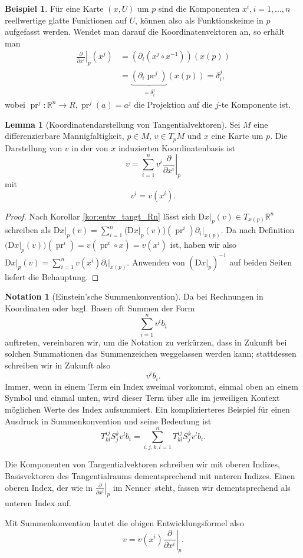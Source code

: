 \documentclass[a4paper]{scrreprt}
\numberwithin{equation}{chapter}
\newcommand{\DD}{\mathrm{D}}
\DeclareMathOperator{\pr}{pr}
\newcommand{\R}{\mathbb{R}}
\theoremstyle{definition}
\newtheorem{lemma}[defn]{Lemma}
\newtheorem{bsp}[defn]{Beispiel}
\newtheorem{nota}[defn]{Notation}
\begin{document}
\begin{bsp}
	Für eine Karte $(x,U)$ um $p$ sind die Komponenten $x^i, i = 1,\dots, n$ reellwertige glatte Funktionen auf $U$, können also als Funktionskeime in $p$ aufgefasst werden. Wendet man darauf die Koordinatenvektoren an, so erhält man
	\begin{align*}
		\left.\frac{\partial}{\partial x^i}\right|_p (x^j) &= \left(\partial_i \left(x^j\circ x^{-1}\right)\right) (x(p))\\
		&= \underbrace{\left(\partial_i \pr^j\right)}_{= \delta^j_i} (x(p)) = \delta^j_i,
	\end{align*}
	wobei $\pr^j\colon \mathbb R^n \to R, \pr^j(a) = a^j$ die Projektion auf die $j$-te Komponente ist.
\end{bsp}

\begin{lemma}[Koordinatendarstellung von Tangentialvektoren]
	Sei $M$ eine differenzierbare Mannigfaltigkeit, $p \in M$, $v \in T_pM$ und $x$ eine Karte um $p$. Die Darstellung von $v$ in der von $x$ induzierten Koordinatenbasis ist
	\[v = \sum_{i=1}^n v^i \left.\frac{\partial}{\partial x^i}\right|_p\]
	mit
	\[v^i = v(x^i).\]

	\begin{proof}
		Nach Korollar \ref{kor:entw_tangt_Rn} lässt sich $\left.\DD x\right|_p(v) \in T_{x(p)}\R^n$ schreiben als $\left.\DD x\right|_p(v) = \sum_{i=1}^n \Big(\DD x\big|_p(v)\Big) (\pr^i) \left.\partial_i\right|_{x(p)}$. Da nach Definition $\Big(\DD x\big|_p(v)\Big) (\pr^i) = v(\pr^i \circ x) = v(x^i)$ ist, haben wir also $\left.\DD x\right|_p(v) = \sum_{i=1}^n v(x^i) \left.\partial_i\right|_{x(p)}$.
		Anwenden von $\left(\left.\DD x\right|_p\right)^{-1}$ auf beiden Seiten liefert die Behauptung.
	\end{proof}
\end{lemma}

\begin{nota}[Einstein'sche Summenkonvention]
	Da bei Rechnungen in Koordinaten oder bzgl. Basen oft Summen der Form
	\[\sum_{i=1}^n v^i b_i\]
	auftreten, vereinbaren wir, um die Notation zu verkürzen, dass in Zukunft bei solchen Summationen das Summenzeichen weggelassen werden kann; stattdessen schreiben wir in Zukunft also
	\[v^i b_i.\]
	Immer, wenn in einem Term ein Index zweimal vorkommt, einmal oben an einem Symbol und einmal unten, wird dieser Term über alle im jeweiligen Kontext möglichen Werte des Index aufsummiert. Ein komplizierteres Beispiel für einen Ausdruck in Summenkonvention und seine Bedeutung ist
	\[T^{ij}_{kl} S^k_j v^l b_i = \sum_{i,j,k,l = 1}^n T^{ij}_{kl} S^k_j v^l b_i.\]

	Die Komponenten von Tangentialvektoren schreiben wir mit oberen Indizes, Basisvektoren des Tangentialraums dementsprechend mit unteren Indizes. Einen oberen Index, der wie in $\left.\frac{\partial}{\partial x^i}\right|_p$ \glqq im Nenner\grqq\ steht, fassen wir dementsprechend als unteren Index auf.

	Mit Summenkonvention lautet die obigen Entwicklungsformel also
	\[v = v(x^i) \left.\frac{\partial}{\partial x^i}\right|_p.\]
\end{nota}
\end{document}
